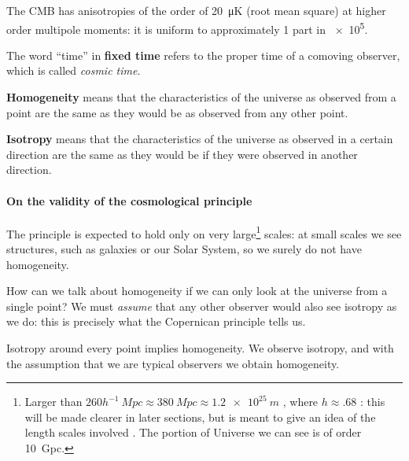 \documentclass[main.tex]{subfiles}
\begin{document}
The CMB has anisotropies of the order of \SI{20}{\micro K} (root mean square) \cite[]{wrightTheoreticalOverviewCosmic2003} at higher order multipole moments: it is uniform to approximately 1 part in \num{e5}.



The word ``time'' in \textbf{fixed time} refers to the proper time of a comoving observer, which is called \emph{cosmic time}.


\textbf{Homogeneity} means that the characteristics of the universe as observed from a point are the same as they would be as observed from any other point. 

\textbf{Isotropy} means that the characteristics of the universe as observed in a certain direction are the same as they would be if they were observed in another direction.

\paragraph{On the validity of the cosmological principle}

The principle is expected to hold only on very large\footnote{Larger than \(260 h^{-1} \SI{}{Mpc} \approx \SI{380}{Mpc} \approx \SI{1.2e25}{m}\) \cite[]{yadavFractalDimensionMeasure2010}, where \(h \approx \num{.68}\) \cite[]{adePlanck2015Results2016}: this will be made clearer in later sections, but is meant to give an idea of the length scales involved . The portion of Universe we can see is of order \SI{10}{Gpc}.} scales:
at small scales we see structures, such as galaxies or our Solar System, so we surely do not have homogeneity.


How can we talk about homogeneity if we can only look at the universe from a single point?
We must \emph{assume} that any other observer would also see isotropy as we do: this is precisely what the Copernican principle tells us.

Isotropy around every point implies homogeneity. We observe isotropy, and with the assumption that we are typical observers we obtain homogeneity.
\end{document}
